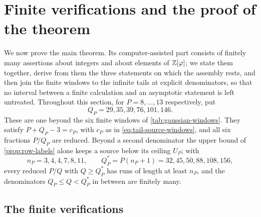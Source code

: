 \section{Finite verifications and the proof of the theorem}\label{sec:assembly}

We now prove the main theorem. Its computer-assisted part consists of
finitely many assertions about integers and about elements of $\mathbb{Z}[\varphi]$;
we state them together, derive from them the three statements on which the
assembly rests, and then join the finite windows to the infinite tails at
explicit denominators, so that no interval between a finite calculation and
an asymptotic statement is left untreated. Throughout this section, for
$P=8,\ldots,13$ respectively, put
\begin{equation}\label{eq:tail-denominators}
 Q_P=29,35,39,76,101,146 .
\end{equation}
These are one beyond the six finite windows of \cref{tab:gaussian-windows}.
They satisfy $P+Q_P-3=c_P$, with $c_P$ as in
\eqref{eq:tail-source-windows}, and all six fractions $P/Q_P$ are reduced.
Beyond a second denominator the upper bound of \cref{prop:row-labels} alone
keeps a source below its ceiling $U_P$; with
\begin{equation}\label{eq:second-junctions}
 n_P=3,4,4,7,8,11,\qquad Q^*_P=P(n_P+1)=32,45,50,88,108,156,
\end{equation}
every reduced $P/Q$ with $Q\geqslant Q^*_P$ has runs of length at least $n_P$,
and the denominators $Q_P\leqslant Q<Q^*_P$ in between are finitely many.

\subsection{The finite verifications}

